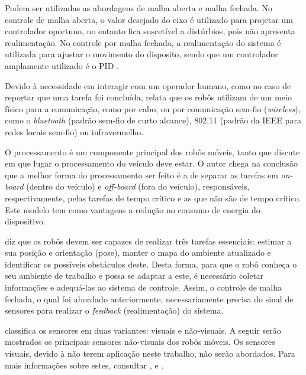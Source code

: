  Podem ser utilizadas as abordagens de malha aberta e malha fechada. No controle 
de malha aberta, o valor desejado do eixo é utilizado para projetar um controlador oportuno, no entanto fica 
suscetível a distúrbios, pois não apresenta realimentação. No controle por malha fechada, a realimentação do sistema é utilizada para 
ajustar o movimento do disposito, sendo que um controlador amplamente utilizado é o PID \cite{dudek_mobile}.

 Devido à necessidade em interagir com um operador humano, como no caso de reportar que 
uma tarefa foi concluída,  relata que os robôs utilizam de um meio físico para a comunicação, como por cabo, ou 
por comunicação sem-fio (\textit{wireless}), como o \textit{bluetooth} (padrão sem-fio de curto alcance), 802.11 (padrão da IEEE 
 para redes locais sem-fio) ou infravermelho.

 O processamento é um componente principal dos robôs móveis, tanto que  
discute em que lugar o processamento do veículo deve estar. O autor chega na conclusão que a melhor forma do processamento ser feito é 
a de separar as tarefas em \textit{on-board} (dentro do veículo) e \textit{off-board} (fora do veículo), responsáveis, 
respectivamente, pelas tarefas de tempo crítico e as que não são de tempo crítico. Este modelo tem como vantagens a redução no consumo 
de energia do dispositivo.

  diz que os robôs devem ser capazes de realizar três tarefas essenciais: estimar a sua posição e orientação 
(pose), manter o mapa do ambiente atualizado e identificar os possíveis obstáculos deste. %
Desta forma, para que o robô conheça o seu ambiente de trabalho e possa se adaptar a este, é necessário coletar informações e 
adequá-las ao sistema de controle. Assim, o controle de malha fechada, o qual foi abordado anteriormente, 
necessariamente precisa do sinal de sensores para realizar o \textit{feedback} (realimentação) do sistema.\par
{} classifica os sensores em duas variantes: visuais e não-visuais.
A seguir serão mostrados os principais sensores não-visuais 
dos robôs móveis. Os sensores visuais, devido à não terem aplicação neste trabalho, não serão abordados. Para mais 
informações sobre estes, consultar \cite{dudek_mobile}, \cite{Intro_auto} e \cite{secchi2012}.


